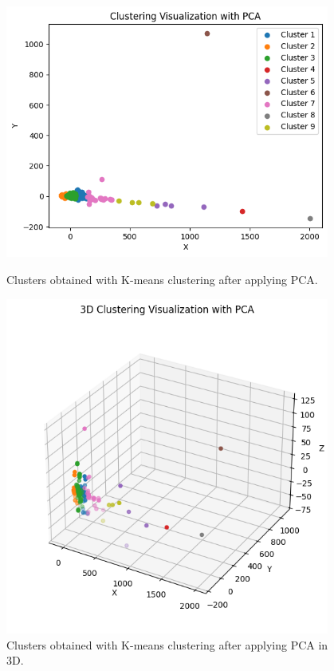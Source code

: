 \begin{figure}[H]
	\centering
	\begin{minipage}[t]{0.48\textwidth}
		\centering
		\includegraphics[width=0.95\textwidth]{../imgs/graphs/clustering/cluster_pca.png}
		\caption{Clusters obtained with K-means clustering after applying PCA.}
		\label{fig:clusters_k9_pca}
	\end{minipage}\hfill
	\begin{minipage}[t]{0.48\textwidth}
		\centering
		\includegraphics[width=0.95\textwidth]{../imgs/graphs/clustering/cluster_pca_3d.png}
		\caption{Clusters obtained with K-means clustering after applying PCA in 3D.}
		\label{fig:clusters_k9_pca_3d}
	\end{minipage}
\end{figure}

